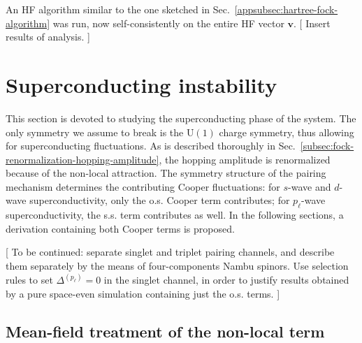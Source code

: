 An HF algorithm similar to the one sketched in Sec.~\ref{appsubsec:hartree-fock-algorithm} was run, now self-consistently on the entire HF vector $\mathbf{v}$. {\color{tabred}[
	Insert results of analysis.
]}

\section{Superconducting instability}

This section is devoted to studying the superconducting phase of the system. The only symmetry we assume to break is the $\mathrm{U}(1)$ charge symmetry, thus allowing for superconducting fluctuations. As is described thoroughly in Sec.~\ref{subsec:fock-renormalization-hopping-amplitude}, the hopping amplitude is renormalized because of the non-local attraction. The symmetry structure of the pairing mechanism determines the contributing Cooper fluctuations: for $s$-wave and $d$-wave superconductivity, only the o.s. Cooper term contributes; for $p_\ell$-wave superconductivity, the s.s. term contributes as well. In the following sections, a derivation containing both Cooper terms is proposed.

{\color{tabred}[
	To be continued: separate singlet and triplet pairing channels, and describe them separately by the means of four-components Nambu spinors. Use selection rules to set $\Delta^{(p_\ell)}=0$ in the singlet channel, in order to justify results obtained by a pure space-even simulation containing just the o.s. terms.
]}

\subsection{Mean-field treatment of the non-local term}

